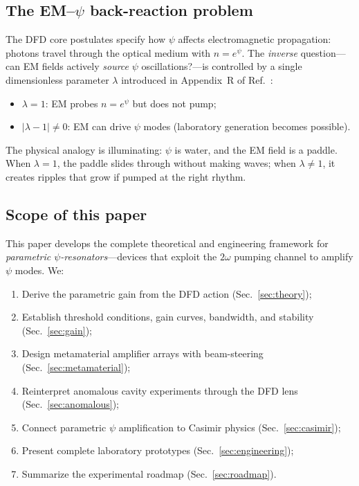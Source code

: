 \documentclass[12pt,aps,prd,twocolumn,superscriptaddress,nofootinbib]{revtex4-2}
\begin{document}
\subsection{The EM--$\psi$ back-reaction problem}

The DFD core postulates specify how $\psi$ affects electromagnetic
propagation: photons travel through the optical medium with
$n = e^\psi$.  The \emph{inverse} question---can EM fields actively
\emph{source} $\psi$ oscillations?---is controlled by a single
dimensionless parameter $\lambda$ introduced in Appendix~R of
Ref.~\cite{Alcock2025DFD}:
\begin{itemize}[noitemsep]
  \item $\lambda = 1$: EM probes $n = e^\psi$ but does not pump;
  \item $|\lambda - 1| \neq 0$: EM can drive $\psi$ modes (laboratory
    generation becomes possible).
\end{itemize}
The physical analogy is illuminating: $\psi$ is water, and the EM field
is a paddle.  When $\lambda = 1$, the paddle slides through without
making waves; when $\lambda \neq 1$, it creates ripples that grow if
pumped at the right rhythm.

\subsection{Scope of this paper}

This paper develops the complete theoretical and engineering framework
for \emph{parametric $\psi$-resonators}---devices that exploit the
$2\omega$ pumping channel to amplify $\psi$ modes.  We:
\begin{enumerate}[noitemsep]
  \item Derive the parametric gain from the DFD action (Sec.~\ref{sec:theory});
  \item Establish threshold conditions, gain curves, bandwidth, and
    stability (Sec.~\ref{sec:gain});
  \item Design metamaterial amplifier arrays with beam-steering
    (Sec.~\ref{sec:metamaterial});
  \item Reinterpret anomalous cavity experiments through the DFD lens
    (Sec.~\ref{sec:anomalous});
  \item Connect parametric $\psi$ amplification to Casimir physics
    (Sec.~\ref{sec:casimir});
  \item Present complete laboratory prototypes
    (Sec.~\ref{sec:engineering});
  \item Summarize the experimental roadmap (Sec.~\ref{sec:roadmap}).
\end{enumerate}
\end{document}

